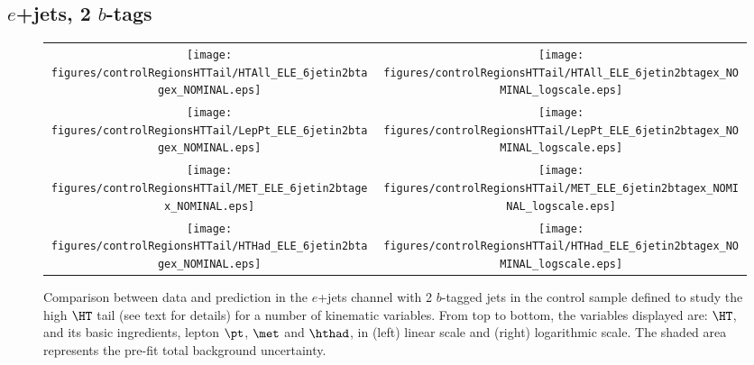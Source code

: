 \clearpage
\subsection{$e$+jets, 2 $b$-tags}
\label{sec:ELE_controlHTTail_2tagex}

\begin{figure}[htbp]
\begin{center}
\begin{tabular}{cc}
%
\texttt{[image: figures/controlRegionsHTTail/HTAll\_ELE\_6jetin2btagex\_NOMINAL.eps]} &
\texttt{[image: figures/controlRegionsHTTail/HTAll\_ELE\_6jetin2btagex\_NOMINAL\_logscale.eps]} \\
\texttt{[image: figures/controlRegionsHTTail/LepPt\_ELE\_6jetin2btagex\_NOMINAL.eps]} &
\texttt{[image: figures/controlRegionsHTTail/LepPt\_ELE\_6jetin2btagex\_NOMINAL\_logscale.eps]} \\
\texttt{[image: figures/controlRegionsHTTail/MET\_ELE\_6jetin2btagex\_NOMINAL.eps]} &
\texttt{[image: figures/controlRegionsHTTail/MET\_ELE\_6jetin2btagex\_NOMINAL\_logscale.eps]} \\
\texttt{[image: figures/controlRegionsHTTail/HTHad\_ELE\_6jetin2btagex\_NOMINAL.eps]} &
\texttt{[image: figures/controlRegionsHTTail/HTHad\_ELE\_6jetin2btagex\_NOMINAL\_logscale.eps]} \\

\end{tabular}\caption{\small {Comparison between data and prediction in the $e$+jets channel with 2 $b$-tagged jets in the control sample
defined to study the high $\HT$ tail (see text for details)  for a number of kinematic
variables. From top to bottom, the variables displayed are: $\HT$, and its basic ingredients, lepton $\pt$, $\met$ and $\hthad$,
in (left) linear scale and (right) logarithmic scale.
The shaded area represents the pre-fit total background uncertainty.}}
\label{fig:ELE_controlHTTail_2btagex_1}
\end{center}
\end{figure}
